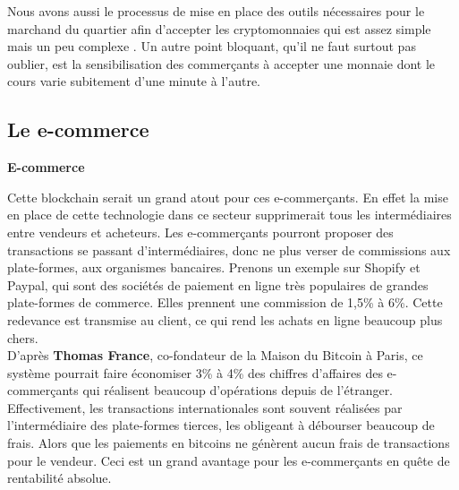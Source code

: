 \documentclass[12pt]{report}
\begin{document}
\hspace{1cm} Nous avons aussi le processus de mise en place des outils nécessaires pour le marchand du quartier afin d'accepter les cryptomonnaies qui est assez simple mais un peu complexe . Un autre point bloquant, qu'il ne faut surtout pas oublier, est la sensibilisation des commerçants à accepter une monnaie dont le cours varie subitement d'une minute à l'autre.



    \subsection{Le e-commerce}
\textbf{E-commerce}

\hspace{1cm} Cette blockchain serait un grand atout pour ces e-commerçants. En effet la mise en place de cette technologie dans ce secteur supprimerait tous les intermédiaires entre vendeurs et acheteurs. Les e-commerçants pourront proposer des transactions se passant d'intermédiaires, donc ne plus verser de commissions aux plate-formes, aux organismes bancaires. Prenons un exemple sur Shopify et Paypal, qui sont des sociétés de paiement en ligne très populaires de grandes plate-formes de commerce. Elles prennent une commission de 1,5\% à 6\%. Cette redevance est transmise au client, ce qui rend les achats en ligne beaucoup plus chers.\\

\hspace{1cm} D'après \textbf{Thomas France}, co-fondateur de la Maison du Bitcoin à Paris, ce système pourrait faire économiser 3\% à 4\% des chiffres d'affaires des e-commerçants qui réalisent beaucoup d'opérations depuis de l'étranger. Effectivement, les transactions internationales sont souvent réalisées par l'intermédiaire des plate-formes tierces, les obligeant à débourser beaucoup de frais. Alors que les paiements en bitcoins ne génèrent aucun frais de transactions pour le vendeur. Ceci est un grand avantage pour les e-commerçants en quête de rentabilité absolue.\\
\end{document}
